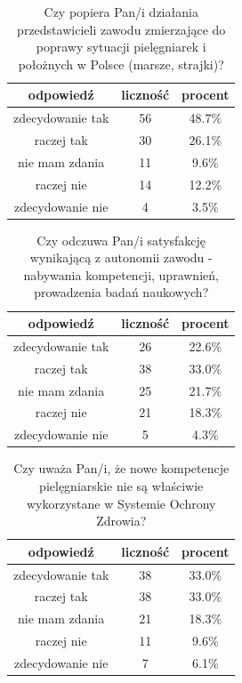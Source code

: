 \documentclass[a4paper,12pt,twoside,openany]{report}
\begin{document}
\begin{table}[h]
\caption{Czy popiera Pan/i działania przedstawicieli zawodu zmierzające do poprawy sytuacji pielęgniarek i położnych w Polsce (marsze, strajki)?}
\centering
\begin{tabular}{ | c | c | c |}
\hline
odpowiedź & liczność & procent\\
\hline
zdecydowanie tak  &  56  & 48.7\% \\
\hline
raczej tak  &  30  & 26.1\% \\
\hline
nie mam zdania  &  11  & 9.6\% \\
\hline
raczej nie  &  14  & 12.2\% \\
\hline
zdecydowanie nie  &  4  & 3.5\% \\
\hline
\end{tabular}
\label{tab:Q19}
\end{table}



\begin{table}[h]
\caption{Czy odczuwa Pan/i satysfakcję wynikającą z autonomii zawodu - nabywania kompetencji, uprawnień, prowadzenia badań naukowych?}
\centering
\begin{tabular}{ | c | c | c |}
\hline
odpowiedź & liczność & procent\\
\hline
zdecydowanie tak  &  26  & 22.6\% \\
\hline
raczej tak  &  38  & 33.0\% \\
\hline
nie mam zdania  &  25  & 21.7\% \\
\hline
raczej nie  &  21  & 18.3\% \\
\hline
zdecydowanie nie  &  5  & 4.3\% \\
\hline
\end{tabular}
\label{tab:Q20}
\end{table}



\begin{table}[h]
\caption{Czy uważa Pan/i, że nowe kompetencje pielęgniarskie nie są właściwie wykorzystane w Systemie Ochrony Zdrowia?}
\centering
\begin{tabular}{ | c | c | c |}
\hline
odpowiedź & liczność & procent\\
\hline
zdecydowanie tak  &  38  & 33.0\% \\
\hline
raczej tak  &  38  & 33.0\% \\
\hline
nie mam zdania  &  21  & 18.3\% \\
\hline
raczej nie  &  11  & 9.6\% \\
\hline
zdecydowanie nie  &  7  & 6.1\% \\
\hline
\end{tabular}
\label{tab:Q21}
\end{table}
\end{document}
